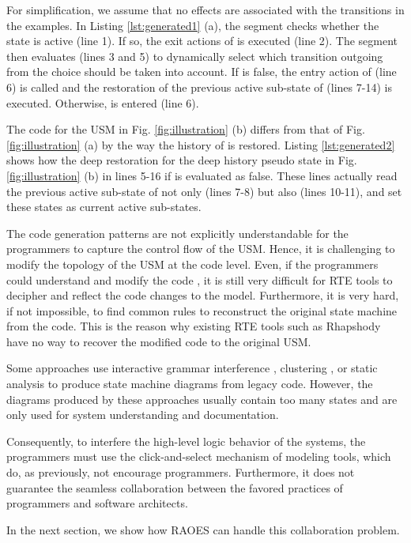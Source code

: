 For simplification, we assume that no effects are associated with the transitions in the examples.
In Listing \ref{lst:generated1} (a), the segment checks whether the state  is active (line 1).
If so, the exit actions of  is executed (line 2).
The segment then evaluates  (lines 3 and 5) to dynamically select which transition outgoing from the choice  should be taken into account.
If  is false, the entry action of  (line 6) is called and the restoration of the previous active sub-state of  (lines 7-14) is executed. 
Otherwise,  is entered (line 6).

The code for the USM in Fig. \ref{fig:illustration} (b) differs from that of Fig. \ref{fig:illustration} (a) by the way the history of  is restored.
Listing \ref{lst:generated2} shows how the deep restoration for the deep history pseudo state in Fig. \ref{fig:illustration} (b) in lines 5-16 if  is evaluated as false.
These lines actually read the previous active sub-state of not only  (lines 7-8) but also  (lines 10-11), and set these states as current active sub-states.

\begin{minipage}{0.95\columnwidth}

\end{minipage}

The code generation patterns are not explicitly understandable for the programmers to capture the control flow of the USM. %
Hence, it is challenging to modify the topology of the USM at the code level. 
Even, if the programmers could understand and modify the code %
, it is still very difficult for RTE tools to decipher and reflect the code changes to the model.
Furthermore, 
it is very hard, if not impossible, to find common rules to reconstruct the original state machine from the code. 
This is the reason why existing RTE tools such as Rhapshody 
have no way to recover the modified code to the original USM.



Some approaches use interactive grammar interference \cite{walkinshaw2007reverse}, clustering \cite{hall2010superstate}, or static analysis \cite{DBLP:conf/kbse/AbadiF12} to produce state machine diagrams from legacy code.
However, the diagrams produced by these approaches usually contain too many states and are only used for system understanding and documentation. 

Consequently, to interfere the high-level logic behavior of the systems, the programmers must use the click-and-select mechanism of modeling tools, which do, as previously, not encourage programmers. 
Furthermore, it does not guarantee the seamless collaboration between the favored practices of programmers and software architects.  

In the next section, we show how RAOES can handle this collaboration problem.